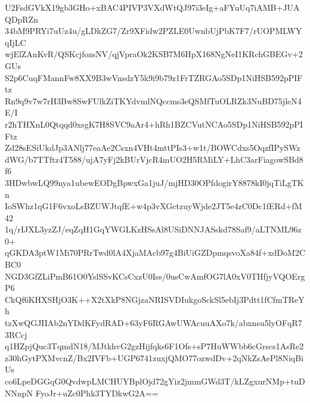 U2FsdGVkX19gb3GHo+xBAC4PIVP3VXdWtQJ97i3eIg+aFYuUq7iAMB+JUAQDpRZn
34bM9PRYi7uUz4u/gLDkZG7/Zr9XFidw2PZLE0UwnbUjPbK7F7/rUOPMLWYqIjLC
wjElZAnKvR/QSKcjfozsNV/qjVpraOk2KSB7M6HpX168NgNeI1KRchGBEGv+2GUs
S2p6CuqFMannFw8XX9B3wVnsdzY5k9i9b79z1FrTZRGAo5SDp1NiHSB592pPIFtz
Rn9q9v7w7rH3Bw8SwFUlkZiTKYdvmlNQccms3eQSMfTuOLRZk3NuBD75jleN4E/I
r2hTHXnL0Qtqqd0xsgK7H8SVC9aAr4+hRh1BZCVutNCAo5SDp1NiHSB592pPIFtz
Zd28sESiUkdJp3ANlj77eaAe2Csxn4VHt4mttPIs3+w1t/BOWCdxs5OqzfIPySWz
dWG/b7TTftz4T588/ujA7yFj2kBUrVjcR4mUO2H5RMiLY+LhC3arFiagowSBd8f6
3HDwbwLQ99nya1ubewEODgBpwxGa1juJ/mjHD30OPfdogirY8878kI0jqTiLgTKn
IoSWhz1qG1F6vxoLsBZUWJtqfE+w4p3vXGctzuyWjde2JT5e4zC0Dc1fERd+fM42
1q/rIJXL3yzZJ/eqZqH1GqYWGLKzHSsAl8USiDNNJASskd78Saf9/aLTNML96z0+
qGKDA3ptW1Mi70PRrTwd0lA4XjaMAcb97g4BiUiGZDpmqsvoXa84f+xdDoM2CBC0
NGD3GfZLiPmB61O0YslSSvKCsCxzU0Iss/0usCwAmfOG7lA0xV0THfjyVQOErgP6
CkQf6KHXSHjO3K++X2tXkP8NGjzaNRISVDIukgoSckSl5ebIj3Pdtt1fCfmTReYh
tzXwQGJIIAb2nYDdKFydRAD+63yF6RGAwUWAcuuAXo7k/abxnsu5lyOFqR73RCcj
q1HZpjQuc3TqmdN18/MJtkhvG2gzHijfqks6F1Ofs+sP7HuWWbb6cGrscs1AsRe2
z30hGytPXMvcnZ/Bx2IVFb+UGP6741zuxjQMO77ozwdDv+2qNkZsAePl8NiqBiUs
co6LpeDGGqG0QvdwpLMCHUYBplOjd72gYiz2jmmGWd3T/kLZgxurNMp+tuDNNnpN
FyoJr+uZc0Phk3TYDkwG2A==
